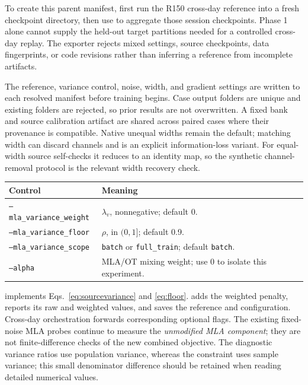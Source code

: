 \documentclass[11pt,a4paper]{article}
\begin{document}
To create this parent manifest, first run the R150 cross-day reference into a
fresh checkpoint directory, then use
 to aggregate those session checkpoints.
Phase 1 alone cannot supply the held-out target partitions needed for a
controlled cross-day replay. The exporter rejects mixed settings, source
checkpoints, data fingerprints, or code revisions rather than inferring a
reference from incomplete artifacts.

The reference, variance control, noise, width, and gradient settings are
written to each resolved manifest before training begins. Case output folders
are unique and existing folders are rejected, so prior results are not
overwritten. A fixed bank and source calibration artifact are shared across
paired cases where their provenance is compatible. Native unequal widths
remain the default; matching width can discard channels and is an explicit
information-loss variant. For equal-width source self-checks it reduces to an
identity map, so the synthetic channel-removal protocol is the relevant width
recovery check.

\begin{tabularx}{\linewidth}{@{}lX@{}}
\toprule
Control & Meaning\\
\midrule
\texttt{--mla\_variance\_weight} & $\lambda_v$, nonnegative; default 0.\\
\texttt{--mla\_variance\_floor} & $\rho$, in $(0,1]$; default 0.9.\\
\texttt{--mla\_variance\_scope} & \texttt{batch} or \texttt{full\_train}; default \texttt{batch}.\\
\texttt{--alpha} & MLA/OT mixing weight; use 0 to isolate this experiment.\\
\bottomrule
\end{tabularx}

 implements Eqs.~\eqref{eq:sourcevariance} and
\eqref{eq:floor}.  adds the weighted penalty, reports
its raw and weighted values, and saves the reference and configuration.
Cross-day orchestration forwards corresponding optional flags. The existing
fixed-noise MLA probes continue to measure the \emph{unmodified MLA component};
they are not finite-difference checks of the new combined objective.
The diagnostic variance ratios use population variance, whereas the constraint
uses sample variance; this small denominator difference should be retained
when reading detailed numerical values.
\end{document}
